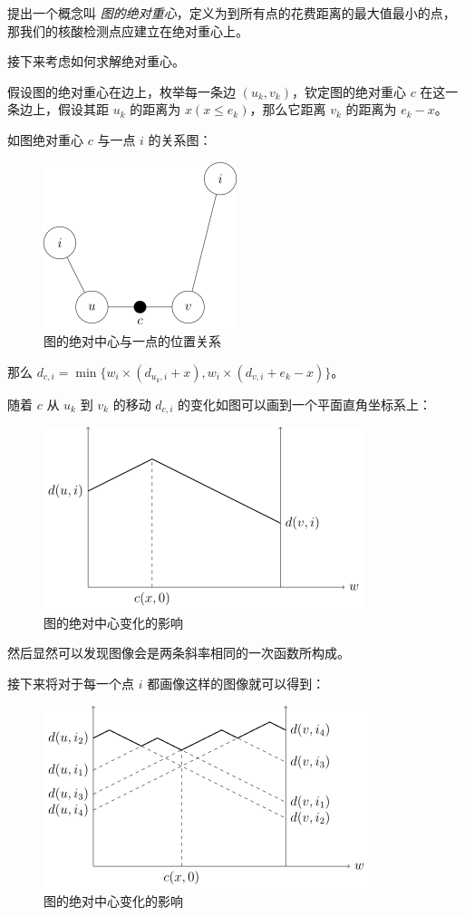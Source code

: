\documentclass{cumcmthesis}
\begin{document}
提出一个概念叫 \emph{图的绝对重心}，定义为到所有点的花费距离的最大值最小的点，那我们的核酸检测点应建立在绝对重心上。

接下来考虑如何求解绝对重心。

假设图的绝对重心在边上，枚举每一条边 $(u_k,v_k)$，钦定图的绝对重心 $c$ 在这一条边上，假设其距 $u_k$ 的距离为 $x(x \le e_k)$，那么它距离 $v_k$ 的距离为 $e_k - x$。

如图绝对重心 $c$ 与一点 $i$ 的关系图：

\begin{figure}[H]
    \centering
    \includegraphics{images/mdst-graph.png}
    \caption{图的绝对中心与一点的位置关系\cite{oiwiki-dmst}}
    \label{fig:mdst-graph}
\end{figure}

那么 $d_{c,i} = \min\{w_i \times (d_{u_k, i} + x), w_i \times (d_{v,i} + e_k - x)\}$。

随着 $c$ 从 $u_k$ 到 $v_k$ 的移动 $d_{c,i}$ 的变化如图可以画到一个平面直角坐标系上：

\begin{figure}[H]
	\centering
	\includegraphics{images/mdst-plot1.png}
	\caption{图的绝对中心变化的影响\cite{oiwiki-dmst}}
	\label{fig:mdst-graph}
\end{figure}

然后显然可以发现图像会是两条斜率相同的一次函数所构成。

接下来将对于每一个点 $i$ 都画像这样的图像就可以得到：

\begin{figure}[H]
	\centering
	\includegraphics{images/mdst-plot2.png}
	\caption{图的绝对中心变化的影响\cite{oiwiki-dmst}}
	\label{fig:mdst-graph}
\end{figure}
\end{document}
